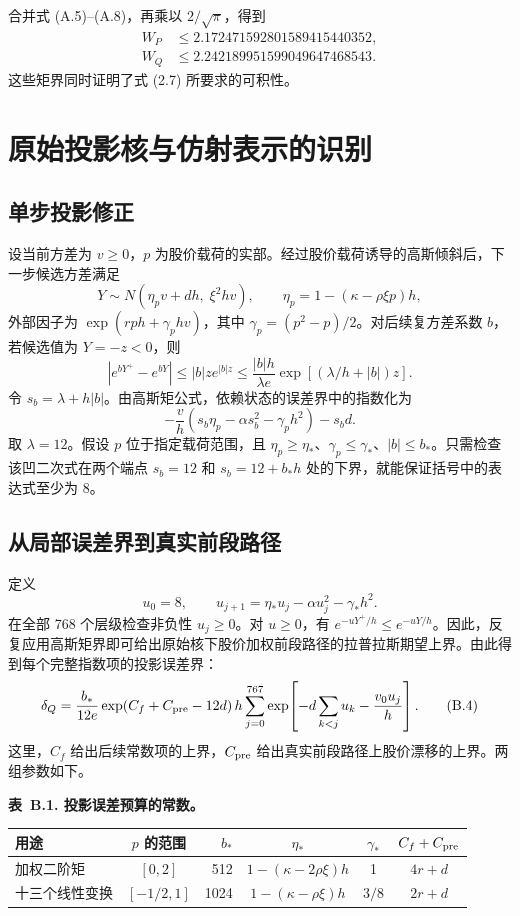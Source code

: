合并式 (A.5)--(A.8)，再乘以 \(2/\sqrt\pi\)，得到
\[
\begin{aligned}
W_P&\le2.172471592801589415440352,\\
W_Q&\le2.242189951599049647468543.
\end{aligned}
\tag{A.9}
\]
这些矩界同时证明了式 (2.7) 所要求的可积性。

\section{原始投影核与仿射表示的识别}

\subsection{单步投影修正}

设当前方差为 \(v\ge0\)，\(p\) 为股价载荷的实部。经过股价载荷诱导的高斯倾斜后，下一步候选方差满足
\[
Y\sim N(\eta_pv+dh,\;\xi^2hv),\qquad
\eta_p=1-(\kappa-\rho\xi p)h,
\]
外部因子为 \(\exp(rph+\gamma_p hv)\)，其中 \(\gamma_p=(p^2-p)/2\)。对后续复方差系数 \(b\)，若候选值为 \(Y=-z<0\)，则
\[
|e^{bY^+}-e^{bY}|
\le |b|z e^{|b|z}
\le \frac{|b|h}{\lambda e}
\exp[(\lambda/h+|b|)z].
\tag{B.1}
\]
令 \(s_b=\lambda+h|b|\)。由高斯矩公式，依赖状态的误差界中的指数化为
\[
-\frac v h\left(s_b\eta_p-\alpha s_b^2-\gamma_ph^2\right)-s_bd.
\tag{B.2}
\]
取 \(\lambda=12\)。假设 \(p\) 位于指定载荷范围，且 \(\eta_p\ge\eta_*\)、\(\gamma_p\le\gamma_*\)、\(|b|\le b_*\)。只需检查该凹二次式在两个端点 \(s_b=12\) 和 \(s_b=12+b_*h\) 处的下界，就能保证括号中的表达式至少为 8。

\subsection{从局部误差界到真实前段路径}

定义
\[
u_0=8,\qquad u_{j+1}=\eta_*u_j-\alpha u_j^2-\gamma_*h^2.
\tag{B.3}
\]
在全部 768 个层级检查非负性 \(u_j\ge0\)。对 \(u\ge0\)，有 \(e^{-uY^+/h}\le e^{-uY/h}\)。因此，反复应用高斯矩界即可给出原始核下股价加权前段路径的拉普拉斯期望上界。由此得到每个完整指数项的投影误差界：
\[
\delta_Q=
\frac{b_*}{12e}\exp(C_f+C_{\rm pre}-12d)\,
h\sum_{j=0}^{767}
\exp\!\left[-d\sum_{k<j}u_k-\frac{v_0u_j}{h}\right].
\tag{B.4}
\]
这里，\(C_f\) 给出后续常数项的上界，\(C_{\rm pre}\) 给出真实前段路径上股价漂移的上界。两组参数如下。

\noindent\textbf{表~B.1. 投影误差预算的常数。}

\begingroup
\small
\setlength{\tabcolsep}{3pt}
\renewcommand{\arraystretch}{1.2}
\begin{tabularx}{\textwidth}{@{}>{\raggedright\arraybackslash}X c r c c c@{}}
\toprule
用途 & \(p\) 的范围 & \(b_*\) & \(\eta_*\) & \(\gamma_*\) & \(C_f+C_{\rm pre}\) \\
\midrule
加权二阶矩 & \([0,2]\) & 512 & \(1-(\kappa-2\rho\xi)h\) & 1 & \(4r+d\) \\
十三个线性变换 & \([-1/2,1]\) & 1024 & \(1-(\kappa-\rho\xi)h\) & \(3/8\) & \(2r+d\) \\
\bottomrule
\end{tabularx}
\endgroup

